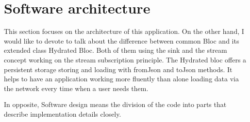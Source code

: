 \section{Software architecture}\label{sec:software-architecture}
This section focuses on the architecture of this application.
On the other hand, I would like to devote to talk about the difference between common Bloc and its extended class Hydrated Bloc.
Both of them using the sink and the stream concept working on the stream subscription principle.
The Hydrated bloc offers a persistent storage storing and loading with fromJson and toJson methods.
It helps to have an application working more fluently than alone loading data via the network every time when a user needs them.

In opposite, Software design means the division of the code into parts that describe implementation details closely.





